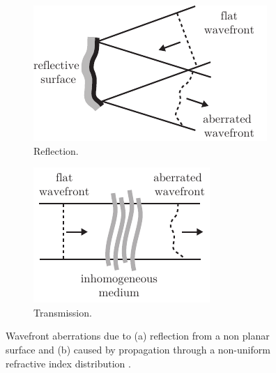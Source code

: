 \begin{figure}[tbh]
       \centering
        \begin{subfigure}[b]{0.4\textwidth}
                \includegraphics[width=\textwidth]{images/wavefront_distortions_reflection}
                \caption{Reflection.}
                \label{fig:abberation_reflection}
        \end{subfigure}
				\hspace{1em}
        \begin{subfigure}[b]{0.3\textwidth}
                \includegraphics[width=\textwidth]{images/wavefront_distortions_transmission}
                \caption{Transmission.}
                \label{fig:abberation_trans}
        \end{subfigure}
        \caption{Wavefront aberrations due to (a) reflection from a non 
planar surface and (b)  caused by propagation through a non-uniform 
refractive index distribution \cite{AOM_basic_ref}.}
\label{fig:abberations}
\end{figure} 

